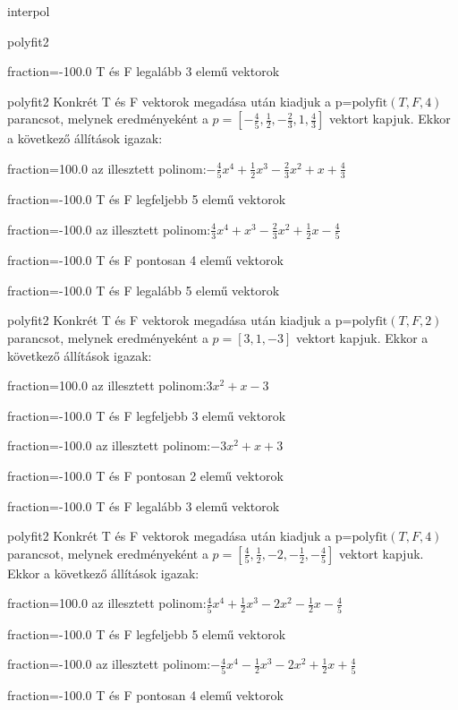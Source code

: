 \documentclass[12pt]{article}
\begin{document}
\begin{quiz}{interpol}
\begin{multi}[multiple]{polyfit2}
\item[fraction=-100.0] T és F legalább 3 elemű vektorok
\end{multi}
\begin{multi}[multiple]{polyfit2}
Konkrét T és F vektorok megadása után kiadjuk a p=$\mathrm{polyfit}(T,F,4)$
parancsot, melynek eredményeként a $p=\left[-\frac{4}{5},\frac{1}{2},-\frac{2}{3},1,\frac{4}{3}\right]$ vektort kapjuk.
Ekkor a következő állítások igazak:
\item[fraction=100.0] az illesztett polinom:$-\frac{4}{5}x^4+\frac{1}{2}x^3-\frac{2}{3}x^2+x+\frac{4}{3}$
\item[fraction=-100.0]  T és F legfeljebb 5 elemű vektorok
\item[fraction=-100.0]  az illesztett polinom:$\frac{4}{3}x^4+x^3-\frac{2}{3}x^2+\frac{1}{2}x-\frac{4}{5}$
\item[fraction=-100.0]  T és F pontosan 4 elemű vektorok
\item[fraction=-100.0] T és F legalább 5 elemű vektorok
\end{multi}
\begin{multi}[multiple]{polyfit2}
Konkrét T és F vektorok megadása után kiadjuk a p=$\mathrm{polyfit}(T,F,2)$
parancsot, melynek eredményeként a $p=\left[3,1,-3\right]$ vektort kapjuk.
Ekkor a következő állítások igazak:
\item[fraction=100.0] az illesztett polinom:$3x^2+x-3$
\item[fraction=-100.0]  T és F legfeljebb 3 elemű vektorok
\item[fraction=-100.0]  az illesztett polinom:$-3x^2+x+3$
\item[fraction=-100.0]  T és F pontosan 2 elemű vektorok
\item[fraction=-100.0] T és F legalább 3 elemű vektorok
\end{multi}
\begin{multi}[multiple]{polyfit2}
Konkrét T és F vektorok megadása után kiadjuk a p=$\mathrm{polyfit}(T,F,4)$
parancsot, melynek eredményeként a $p=\left[\frac{4}{5},\frac{1}{2},-2,-\frac{1}{2},-\frac{4}{5}\right]$ vektort kapjuk.
Ekkor a következő állítások igazak:
\item[fraction=100.0] az illesztett polinom:$\frac{4}{5}x^4+\frac{1}{2}x^3-2x^2-\frac{1}{2}x-\frac{4}{5}$
\item[fraction=-100.0]  T és F legfeljebb 5 elemű vektorok
\item[fraction=-100.0]  az illesztett polinom:$-\frac{4}{5}x^4-\frac{1}{2}x^3-2x^2+\frac{1}{2}x+\frac{4}{5}$
\item[fraction=-100.0]  T és F pontosan 4 elemű vektorok

\end{multi}
\end{quiz}
\end{document}
